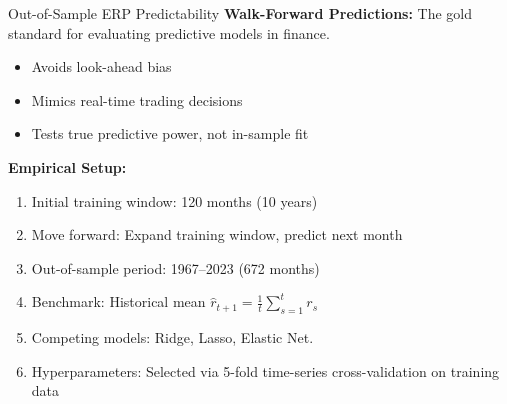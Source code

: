 \documentclass[10pt]{beamer}
\begin{document}
\begin{frame}{Out-of-Sample ERP Predictability}
  \textbf{Walk-Forward Predictions:} The gold standard for evaluating predictive models in finance.
  \begin{itemize}
        \item Avoids look-ahead bias
      \item Mimics real-time trading decisions
      \item Tests true predictive power, not in-sample fit
    \end{itemize}
    
  \vspace{1em}
 \textbf{Empirical Setup:}
  \begin{enumerate}
    \item Initial training window: 120 months (10 years)
    \item Move forward: Expand training window, predict next month
    \item Out-of-sample period: 1967--2023 (672 months)
    \item Benchmark: Historical mean $\widehat{r}_{t+1} = \frac{1}{t}\sum_{s=1}^t r_s$
    \item Competing models: Ridge, Lasso, Elastic Net.
    \item Hyperparameters: Selected via 5-fold time-series cross-validation on training data
  \end{enumerate}
  
\end{frame}
\end{document}
